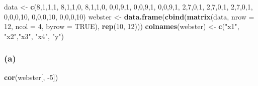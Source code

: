 \documentclass[
]{article}
\newenvironment{Shaded}{\begin{snugshade}}{\end{snugshade}}
\newcommand{\DataTypeTok}[1]{\textcolor[rgb]{0.13,0.29,0.53}{#1}}
\newcommand{\DecValTok}[1]{\textcolor[rgb]{0.00,0.00,0.81}{#1}}
\newcommand{\KeywordTok}[1]{\textcolor[rgb]{0.13,0.29,0.53}{\textbf{#1}}}
\newcommand{\NormalTok}[1]{#1}
\newcommand{\OtherTok}[1]{\textcolor[rgb]{0.56,0.35,0.01}{#1}}
\newcommand{\StringTok}[1]{\textcolor[rgb]{0.31,0.60,0.02}{#1}}
\begin{document}
\begin{Shaded}
\begin{Highlighting}[]
\NormalTok{data <-}\StringTok{ }\KeywordTok{c}\NormalTok{(}\DecValTok{8}\NormalTok{,}\DecValTok{1}\NormalTok{,}\DecValTok{1}\NormalTok{,}\DecValTok{1}\NormalTok{,}
          \DecValTok{8}\NormalTok{,}\DecValTok{1}\NormalTok{,}\DecValTok{1}\NormalTok{,}\DecValTok{0}\NormalTok{,}
          \DecValTok{8}\NormalTok{,}\DecValTok{1}\NormalTok{,}\DecValTok{1}\NormalTok{,}\DecValTok{0}\NormalTok{,}
          \DecValTok{0}\NormalTok{,}\DecValTok{0}\NormalTok{,}\DecValTok{9}\NormalTok{,}\DecValTok{1}\NormalTok{,}
          \DecValTok{0}\NormalTok{,}\DecValTok{0}\NormalTok{,}\DecValTok{9}\NormalTok{,}\DecValTok{1}\NormalTok{,}
          \DecValTok{0}\NormalTok{,}\DecValTok{0}\NormalTok{,}\DecValTok{9}\NormalTok{,}\DecValTok{1}\NormalTok{,}
          \DecValTok{2}\NormalTok{,}\DecValTok{7}\NormalTok{,}\DecValTok{0}\NormalTok{,}\DecValTok{1}\NormalTok{,}
          \DecValTok{2}\NormalTok{,}\DecValTok{7}\NormalTok{,}\DecValTok{0}\NormalTok{,}\DecValTok{1}\NormalTok{,}
          \DecValTok{2}\NormalTok{,}\DecValTok{7}\NormalTok{,}\DecValTok{0}\NormalTok{,}\DecValTok{1}\NormalTok{,}
          \DecValTok{0}\NormalTok{,}\DecValTok{0}\NormalTok{,}\DecValTok{0}\NormalTok{,}\DecValTok{10}\NormalTok{,}
          \DecValTok{0}\NormalTok{,}\DecValTok{0}\NormalTok{,}\DecValTok{0}\NormalTok{,}\DecValTok{10}\NormalTok{,}
          \DecValTok{0}\NormalTok{,}\DecValTok{0}\NormalTok{,}\DecValTok{0}\NormalTok{,}\DecValTok{10}\NormalTok{)}
\NormalTok{webster <-}\StringTok{ }\KeywordTok{data.frame}\NormalTok{(}\KeywordTok{cbind}\NormalTok{(}\KeywordTok{matrix}\NormalTok{(data, }\DataTypeTok{nrow =} \DecValTok{12}\NormalTok{, }\DataTypeTok{ncol =} \DecValTok{4}\NormalTok{, }\DataTypeTok{byrow =} \OtherTok{TRUE}\NormalTok{), }\KeywordTok{rep}\NormalTok{(}\DecValTok{10}\NormalTok{, }\DecValTok{12}\NormalTok{)))}
\KeywordTok{colnames}\NormalTok{(webster) <-}\StringTok{ }\KeywordTok{c}\NormalTok{(}\StringTok{"x1"}\NormalTok{, }\StringTok{"x2"}\NormalTok{,}\StringTok{"x3"}\NormalTok{, }\StringTok{"x4"}\NormalTok{, }\StringTok{"y"}\NormalTok{)}
\end{Highlighting}
\end{Shaded}

\hypertarget{a}{%
\subsubsection{(a)}\label{a}}

\begin{Shaded}
\begin{Highlighting}[]
\KeywordTok{cor}\NormalTok{(webster[, }\DecValTok{-5}\NormalTok{])}
\end{Highlighting}
\end{Shaded}
\end{document}
